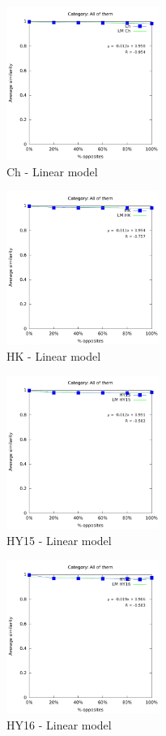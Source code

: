 \documentclass[a4paper,10pt]{article}
\begin{document}
\begin{figure}[ht]{\centering
\includegraphics[height=5cm]{allcat_Ch_LM.pdf}
\caption{Ch - Linear model}
}\end{figure}
\begin{figure}[ht]{\centering
\includegraphics[height=5cm]{allcat_HK_LM.pdf}
\caption{HK - Linear model}
}\end{figure}
\begin{figure}[ht]{\centering
\includegraphics[height=5cm]{allcat_HY15_LM.pdf}
\caption{HY15 - Linear model}
}\end{figure}
\begin{figure}[ht]{\centering
\includegraphics[height=5cm]{allcat_HY16_LM.pdf}
\caption{HY16 - Linear model}
}\end{figure}
\end{document}
